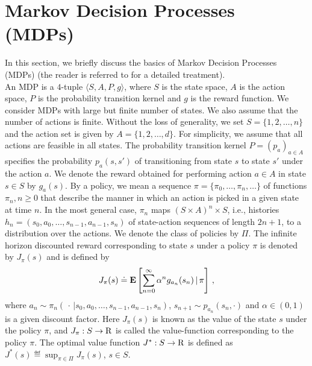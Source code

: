 \section{Markov Decision Processes (MDPs)}
In this section, we briefly discuss the basics of Markov Decision Processes (MDPs) (the reader is referred to \cite{BertB,Puter} for a detailed treatment).\\
An MDP is a $4$-tuple $\langle S,A,P,g\rangle$, where $S$ is the state space, $A$ is the action space, $P$ is the probability transition kernel and $g$ is the reward function. We consider MDPs with large but finite number of states. We also assume that the number of actions is finite.
Without the loss of generality, we set  $S=\{1,2,\ldots,n\}$  and the action set is given by $A=\{1,2,\ldots,d\}$. For simplicity, we assume that all actions are feasible in all states. 
The probability transition kernel $P= (p_a)_{a\in A}$ specifies the probability $p_a(s,s')$ of transitioning from state $s$ to state $s'$ under the action $a$. We denote the reward obtained for performing action $a\in A$ in state $s\in S$ by $g_a(s)$.
By a policy, we mean a sequence $\pi=\{\pi_0,\ldots,\pi_n,\ldots\}$ of functions $\pi_n, n\geq 0$ 
	that describe the manner in which an action is picked in a given state at time $n$. 
In the most general case, $\pi_n$ maps $(S \times A)^n \times S$, i.e., 
	histories $h_n =(s_0,a_0,\dots,s_{n-1},a_{n-1},s_n)$ 
	of state-action sequences of length $2n+1$, to a distribution over the actions. 
We denote the class of policies by $\Pi$. 
The infinite horizon discounted reward corresponding to state $s$ under a policy $\pi$ is denoted by $J_\pi(s)$ and is defined by 
\begin{align}
J_\pi(s) \eqdef
	\E\left[\sum_{n=0}^\infty \alpha^n g_{a_n}(s_n)\,\Large|\,\pi\right]\,,\nn
\end{align}
	where $a_{n} \sim \pi_n(\,\cdot\,|s_0,a_0,\dots,s_{n-1},a_{n-1},s_n)$, $s_{n+1} \sim p_{a_n}(s_n,\cdot)$ 
	and $\alpha \in (0,1)$ is a given discount factor. 
Here $J_\pi(s)$ is known as the value of the state $s$ under the policy $\pi$, and $J_\pi:S\to \mathrm{R}$ is 
 called the value-function corresponding to the policy $\pi$. 
 The optimal value function $J^*:S\to \mathrm{R}$ is defined as $J^*(s) \eqdef
 \sup_{\pi\in\Pi} J_\pi(s)$, $s\in S$.
 
